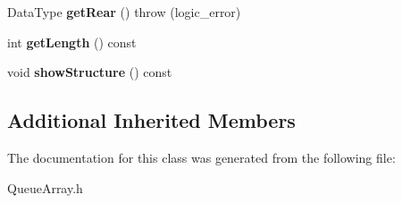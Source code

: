 \begin{DoxyCompactItemize}
\item 
\hypertarget{class_queue_array_a8bebf91214e116f74d4482bf9babee2d}{Data\+Type {\bfseries get\+Rear} ()  throw (logic\+\_\+error)}\label{class_queue_array_a8bebf91214e116f74d4482bf9babee2d}

\item 
\hypertarget{class_queue_array_a1d1bf41a4ca23c30f53296a0e0c5bf33}{int {\bfseries get\+Length} () const }\label{class_queue_array_a1d1bf41a4ca23c30f53296a0e0c5bf33}

\item 
\hypertarget{class_queue_array_adde651b7fd7865dc4f281e21c7f1a6c3}{void {\bfseries show\+Structure} () const }\label{class_queue_array_adde651b7fd7865dc4f281e21c7f1a6c3}

\end{DoxyCompactItemize}
\subsection*{Additional Inherited Members}


The documentation for this class was generated from the following file\+:\begin{DoxyCompactItemize}
\item 
Queue\+Array.\+h\end{DoxyCompactItemize}

